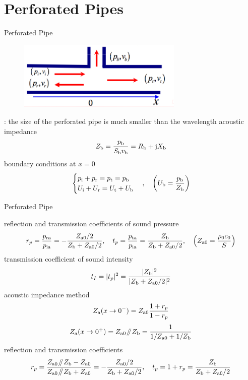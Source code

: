 \documentclass[9pt,mathserif]{beamer}
\let\emph\relax %
\begin{document}
\section{Perforated Pipes}

\begin{frame}{Perforated Pipe}
	\begin{figure}
		\centering
		\includegraphics[width=0.7\textwidth]{img/duct/perforatedPipeMod.jpg}
	\end{figure}
	\begin{outline}
		\1 \emph{Assumption}: the size of the perforated pipe is much smaller 
		than the wavelength
		\1 acoustic impedance
		$$Z_\text{b} = \frac{p_\text{b}}{S_\text{b}v_\text{b}} = R_\text{b}+\mathrm{j} X_\text{b}$$
		\1 boundary conditions at $x=0$
		$$
		\begin{cases}
			p\st{i}+p\st{r} = p\st{t} = p\st{b}\\
			U\st{i}+U\st{r} = U\st{t} + U\st{b}
		\end{cases}
		\qc 
		\qty(U\st{b} = \frac{p\st{b}}{Z\st{b}})
		$$
	\end{outline}
\end{frame}

\begin{frame}{Perforated Pipe}
	\begin{outline}
		\1 reflection and transmission coefficients of sound pressure
		$$ r_p = \frac{p\st{ra}}{p\st{ia}} = -\frac{Z\st{a0}/2}{Z\st{b}+
			Z\st{a0}/2}
			\qc 
			t_p = \frac{p\st{ta}}{p\st{ia}} = \frac{Z\st{b}}{Z\st{b}+
			Z\st{a0}/2}
			\qc 
			\qty(Z\st{a0}= \frac{\rho_0c_0}{S})
		$$
		\1 transmission coefficient of sound intensity
		$$t_I = |t_p|^2 = \frac{|Z_\text{b}|^2}{|Z_\text{b}+Z_\text{a0}/2|^2}$$
		\1 acoustic impedance method
		$$Z_\text{a}(x\to 0^-) = Z_\text{a0} \frac{1+r_p}{1-r_p}$$
		$$Z_\text{a}(x\to 0^+) = Z_\text{a0} \mathbin{\!/\mkern-5mu/\!} Z_\text{b}
		=\frac{1}{1/Z_\text{a0}+1/Z_\text{b}}$$
		\1 reflection and transmission coefficients
		$$
		r_p = \frac{Z\st{a0}\parabins Z\st{b}-Z\st{a0}}{Z\st{a0}\parabins
		Z\st{b} + Z\st{a0}} = -\frac{Z\st{a0}/2}{Z\st{b}+Z\st{a0}/2}
		\qc
		t_p = 1+r_p = \frac{Z\st{b}}{Z\st{b}+Z\st{a0}/2}$$
	\end{outline}
\end{frame}
\end{document}
